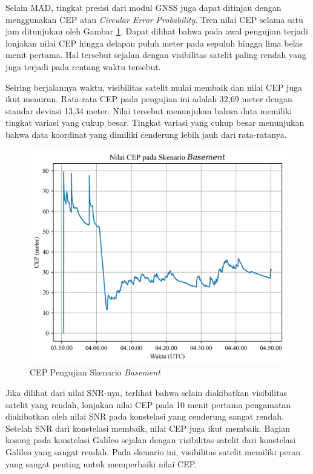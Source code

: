 Selain MAD, tingkat presisi dari modul GNSS juga dapat ditinjau dengan menggunakan CEP atau \textit{Circular Error Probability}. Tren nilai CEP selama satu jam ditunjukan oleh Gambar \ref{Fig: basement-cep}. Dapat dilihat bahwa pada awal pengujian terjadi lonjakan nilai CEP hingga delapan puluh meter pada sepuluh hingga lima belas menit pertama. Hal tersebut sejalan dengan visibilitas satelit paling rendah yang juga terjadi pada rentang waktu tersebut. 

Seiring berjalannya waktu, visibilitas satelit mulai membaik dan nilai CEP juga ikut menurun. Rata-rata CEP pada pengujian ini adalah 32,69 meter dengan standar deviasi 13,34 meter. Nilai tersebut menunjukan bahwa data memiliki tingkat variasi yang cukup besar. Tingkat variasi yang cukup besar menunjukan bahwa data koordinat yang dimiliki cenderung lebih jauh dari rata-ratanya.

\begin{figure}[H]
	\centering
	\includegraphics[width=13cm]{contents/chapter-4/1-skenario-basement/cep.png}
	\caption{CEP Pengujian Skenario \textit{Basement}}
	\label{Fig: basement-cep}
\end{figure}

Jika dilihat dari nilai SNR-nya, terlihat bahwa selain diakibatkan visibilitas satelit yang rendah, lonjakan nilai CEP pada 10 menit pertama pengamatan diakibatkan oleh nilai SNR pada konstelasi yang cenderung sangat rendah. Setelah SNR dari konstelasi membaik, nilai CEP juga ikut membaik. Bagian kosong pada konstelasi Galileo sejalan dengan visibilitas satelit dari konstelasi Galileo yang sangat rendah. Pada skenario ini, visibilitas satelit memiliki peran yang sangat penting untuk memperbaiki nilai CEP.

